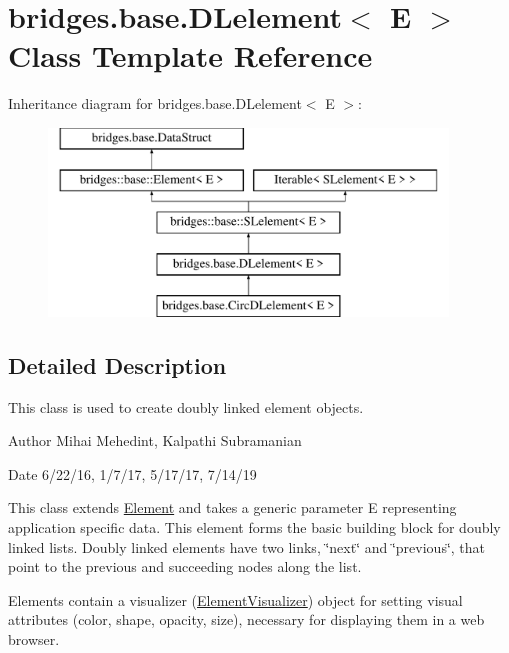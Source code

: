 \hypertarget{classbridges_1_1base_1_1_d_lelement}{}\section{bridges.\+base.\+D\+Lelement$<$ E $>$ Class Template Reference}
\label{classbridges_1_1base_1_1_d_lelement}
Inheritance diagram for bridges.\+base.\+D\+Lelement$<$ E $>$\+:\begin{figure}[H]
\begin{center}
\leavevmode
\includegraphics[height=5.000000cm]{classbridges_1_1base_1_1_d_lelement}
\end{center}
\end{figure}


\subsection{Detailed Description}
This class is used to create doubly linked element objects. 

\begin{DoxyAuthor}{Author}
Mihai Mehedint, Kalpathi Subramanian
\end{DoxyAuthor}
\begin{DoxyDate}{Date}
6/22/16, 1/7/17, 5/17/17, 7/14/19
\end{DoxyDate}
This class extends \hyperlink{classbridges_1_1base_1_1_element}{Element} and takes a generic parameter E representing application specific data. This element forms the basic building block for doubly linked lists. Doubly linked elements have two links, \char`\"{}next\char`\"{} and \char`\"{}previous\char`\"{}, that point to the previous and succeeding nodes along the list.

Elements contain a visualizer (\hyperlink{classbridges_1_1base_1_1_element_visualizer}{Element\+Visualizer}) object for setting visual attributes (color, shape, opacity, size), necessary for displaying them in a web browser.

